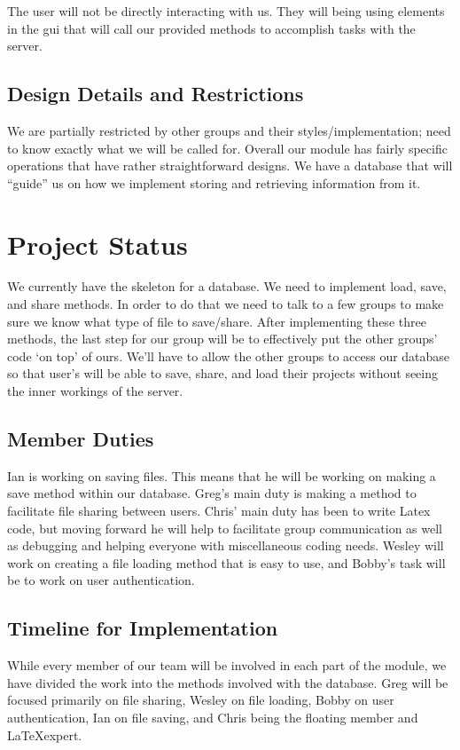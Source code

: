 \documentclass[12pt]{article}
\begin{document}
The user will not be directly interacting with us. They will being using elements in the gui that will call our provided methods to accomplish tasks with the server. 

\subsection{Design Details and Restrictions}

We are partially restricted by other groups and their styles/implementation; need to know exactly what we will be called for. Overall our module has fairly specific operations that have rather straightforward designs. We have a database that will “guide” us on how we implement storing and retrieving information from it.


\section{Project Status}

We currently have the skeleton for a database. We need to implement load, save, and share methods. In order to do that we need to talk to a few groups to make sure we know what type of file to save/share. After implementing these three methods, the last step for our group will be to effectively put the other groups’ code ‘on top’ of ours. We’ll have to allow the other groups to access our database so that user’s will be able to save, share, and load their projects without seeing the inner workings of the server.

\subsection{Member Duties}
Ian is working on saving files. This means that he will be working on making a save method within our database. Greg's main duty is making a method to facilitate file sharing between users. Chris' main duty has been to write Latex code, but moving forward he will help to facilitate group communication as well as debugging and helping everyone with miscellaneous coding needs. Wesley will work on creating a file loading method that is easy to use, and Bobby's task will be to work on user authentication.

\subsection{Timeline for Implementation}
While every member of our team will be involved in each part of the module, we have divided the work into the methods involved with the database. Greg will be focused primarily on file sharing, Wesley on file loading, Bobby on user authentication, Ian on file saving, and Chris being the floating member and \LaTeX expert. 
\end{document}
